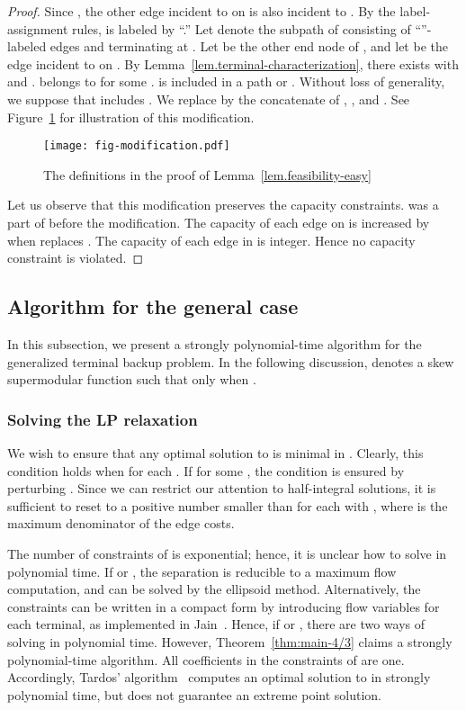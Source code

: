 \documentclass{article}
\begin{document}
\begin{proof}
  Since ,
  the other edge  incident to  on  is also incident to .
  By the label-assignment rules,  is labeled by ``.''
  Let  denote the subpath of
   consisting of ``''-labeled edges and terminating at .
  Let  be the other end node of ,
  and let  be the edge incident to  on .
  By Lemma~\ref{lem.terminal-characterization}, there exists  with
   and  .
   belongs to  for some .
   is included in a path  or .
  Without loss of generality, we suppose that  includes .
  We replace  by the concatenate of , , and .
  See Figure~\ref{fig.modification} for illustration of this modification.
  
  \begin{figure}
  \centering
   \texttt{[image: fig-modification.pdf]}
   \caption{The definitions in the proof of Lemma~\ref{lem.feasibility-easy}}
   \label{fig.modification}
  \end{figure}
  
  Let us observe that this modification preserves the capacity
  constraints.
   was a part of  before the modification.
  The capacity of each edge on  is increased by  when 
  replaces .
  The capacity of each edge in  is integer.
  Hence no capacity constraint is violated.
 \end{proof}


\subsection{Algorithm for the general case}
In this subsection, we present a strongly polynomial-time algorithm for the generalized terminal
backup problem.
In the following discussion,
 denotes a skew supermodular function such that 
only when .

\subsubsection*{Solving the LP relaxation}
We wish to ensure that any optimal solution  to  
is minimal in . Clearly, this condition holds when  for each .
If  for some , the condition is ensured by perturbing .
Since we can restrict our attention to half-integral solutions,
it is sufficient to reset  
to a positive number smaller than  for each  with ,
where  is the maximum denominator of the edge costs.

The number of constraints of  is exponential;
hence, it is unclear how to solve  in polynomial time.
If  or ,
the separation is reducible to
a maximum flow computation, and  can be solved by the ellipsoid method.
Alternatively, the constraints can be written in a compact form by introducing flow variables for
each terminal, as implemented in Jain~\cite{Jain01}.
Hence, if  or , there are two ways of solving
 in polynomial time.
However, Theorem~\ref{thm:main-4/3} claims a strongly polynomial-time algorithm.
All coefficients in the constraints of  are one. Accordingly, 
Tardos' algorithm~\cite{Tardos1986} computes
an optimal solution to  in strongly polynomial time,
but does not guarantee an extreme point solution.
\end{document}
